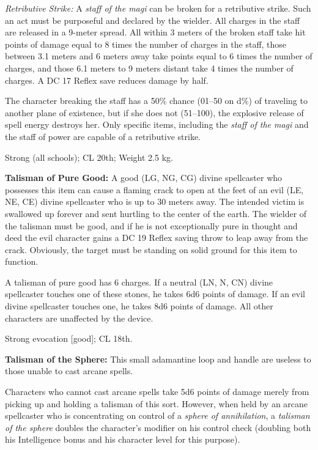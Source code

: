 \textit{Retributive Strike:} A \emph{staff of the magi} can be broken for a retributive strike. Such an act must be purposeful and declared by the wielder. All charges in the staff are released in a 9-meter spread. All within 3 meters of the broken staff take hit points of damage equal to 8 times the number of charges in the staff, those between 3.1 meters and 6 meters away take points equal to 6 times the number of charges, and those 6.1 meters to 9 meters distant take 4 times the number of charges. A DC 17 Reflex save reduces damage by half.

The character breaking the staff has a 50\% chance (01--50 on d\%) of traveling to another plane of existence, but if she does not (51--100), the explosive release of spell energy destroys her. Only specific items, including the \emph{staff of the magi} and the staff of power are capable of a retributive strike.

Strong (all schools); CL 20th; Weight 2.5 kg.

\textbf{Talisman of Pure Good:} A good (LG, NG, CG) divine spellcaster who possesses this item can cause a flaming crack to open at the feet of an evil (LE, NE, CE) divine spellcaster who is up to 30 meters away. The intended victim is swallowed up forever and sent hurtling to the center of the earth. The wielder of the talisman must be good, and if he is not exceptionally pure in thought and deed the evil character gains a DC 19 Reflex saving throw to leap away from the crack. Obviously, the target must be standing on solid ground for this item to function.

A talisman of pure good has 6 charges. If a neutral (LN, N, CN) divine spellcaster touches one of these stones, he takes 6d6 points of damage. If an evil divine spellcaster touches one, he takes 8d6 points of damage. All other characters are unaffected by the device.

Strong evocation [good]; CL 18th.

\textbf{Talisman of the Sphere:} This small adamantine loop and handle are useless to those unable to cast arcane spells.

Characters who cannot cast arcane spells take 5d6 points of damage merely from picking up and holding a talisman of this sort. However, when held by an arcane spellcaster who is concentrating on control of a \emph{sphere of annihilation}, a \emph{talisman of the sphere} doubles the character's modifier on his control check (doubling both his Intelligence bonus and his character level for this purpose).

